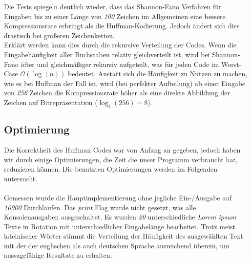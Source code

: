 \documentclass[course=erap]{aspdoc}
\begin{document}
Die Tests spiegeln deutlich wieder, dass das Shannon-Fano Verfahren für Eingaben bis zu einer Länge von \textit{100} Zeichen im Allgemeinen eine bessere Kompressionsrate erbringt als die Huffman-Kodierung. Jedoch ändert sich dies drastisch bei größeren Zeichenketten.\\
Erklärt werden kann dies durch die rekursive Verteilung der Codes. Wenn die Eingabehäufigkeit aller Buchstaben relativ gleichverteilt ist, wird bei Shannon-Fano öfter und gleichmäßiger rekursiv aufgeteilt, was für jeden Code im Worst-Case $\mathcal{O}(\log(n))$ bedeutet. Anstatt sich die Häufigkeit zu Nutzen zu machen, wie es bei Huffman der Fall ist, wird (bei perfekter Aufteilung) ab einer Eingabe von \textit{256} Zeichen die Kompressionsrate höher als eine direkte Abbildung der Zeichen auf Bitrepräsentation ($\log_2(256)=8$). \cite{1819Vorlesung15a}
\subsection{Optimierung}
Die Korrektheit des Huffman Codes war von Anfang an gegeben, jedoch haben wir durch einige Optimierungen, die Zeit die unser Programm verbraucht hat, reduzieren können. Die benutzten Optimierungen werden im Folgenden untersucht.\\\\
Gemessen wurde die Hauptimplementierung ohne jegliche Ein-/Ausgabe auf \textit{10000} Durchläufen. Das \textit{print} Flag wurde nicht gesetzt, was alle Konsolenausgaben ausgeschaltet. Es wurden \textit{20} unterschiedliche \textit{Lorem ipsum}\cite{lorem_ipsum-generator_und_informationen} Texte in Rotation mit unterschiedlicher Eingabelänge bearbeitet. Trotz meist lateinischer Wörter stimmt die Verteilung der Häufigkeit des ausgewählten Text mit der der englischen als auch deutschen Sprache ausreichend überein, um aussagefähige Resultate zu erhalten.
\end{document}
